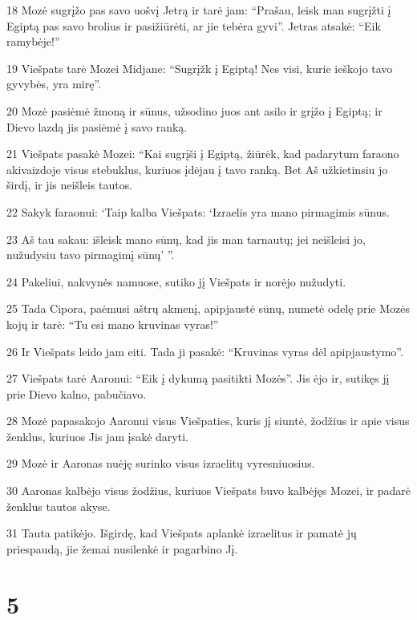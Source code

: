 \par 18 Mozė sugrįžo pas savo uošvį Jetrą ir tarė jam: “Prašau, leisk man sugrįžti į Egiptą pas savo brolius ir pasižiūrėti, ar jie tebėra gyvi”. Jetras atsakė: “Eik ramybėje!” 
\par 19 Viešpats tarė Mozei Midjane: “Sugrįžk į Egiptą! Nes visi, kurie ieškojo tavo gyvybės, yra mirę”. 
\par 20 Mozė pasiėmė žmoną ir sūnus, užsodino juos ant asilo ir grįžo į Egiptą; ir Dievo lazdą jis pasiėmė į savo ranką. 
\par 21 Viešpats pasakė Mozei: “Kai sugrįši į Egiptą, žiūrėk, kad padarytum faraono akivaizdoje visus stebuklus, kuriuos įdėjau į tavo ranką. Bet Aš užkietinsiu jo širdį, ir jis neišleis tautos. 
\par 22 Sakyk faraonui: ‘Taip kalba Viešpats: ‘Izraelis yra mano pirmagimis sūnus. 
\par 23 Aš tau sakau: išleisk mano sūnų, kad jis man tarnautų; jei neišleisi jo, nužudysiu tavo pirmagimį sūnų’ ”. 
\par 24 Pakeliui, nakvynės namuose, sutiko jį Viešpats ir norėjo nužudyti. 
\par 25 Tada Cipora, paėmusi aštrų akmenį, apipjaustė sūnų, numetė odelę prie Mozės kojų ir tarė: “Tu esi mano kruvinas vyras!” 
\par 26 Ir Viešpats leido jam eiti. Tada ji pasakė: “Kruvinas vyras dėl apipjaustymo”. 
\par 27 Viešpats tarė Aaronui: “Eik į dykumą pasitikti Mozės”. Jis ėjo ir, sutikęs jį prie Dievo kalno, pabučiavo. 
\par 28 Mozė papasakojo Aaronui visus Viešpaties, kuris jį siuntė, žodžius ir apie visus ženklus, kuriuos Jis jam įsakė daryti. 
\par 29 Mozė ir Aaronas nuėję surinko visus izraelitų vyresniuosius. 
\par 30 Aaronas kalbėjo visus žodžius, kuriuos Viešpats buvo kalbėjęs Mozei, ir padarė ženklus tautos akyse. 
\par 31 Tauta patikėjo. Išgirdę, kad Viešpats aplankė izraelitus ir pamatė jų priespaudą, jie žemai nusilenkė ir pagarbino Jį.



\chapter{5}

